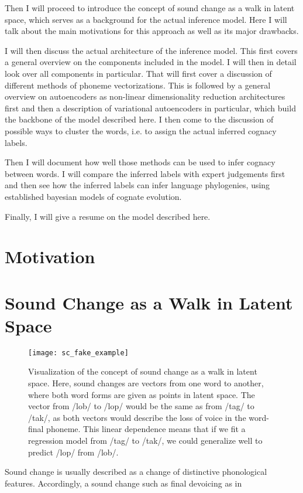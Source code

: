 \documentclass[8pt]{article}
\begin{document}
Then I will proceed to introduce the concept of sound change as a walk in latent space, which serves as a background for the actual inference model. Here I will talk about the main motivations for this approach as well as its major drawbacks. 


I will then discuss the actual architecture of the inference model. This first covers a general overview on the components included in the model. I will then in detail look over all components in particular. That will first cover a discussion of different methods of phoneme vectorizations. This is followed by a general overview on autoencoders as non-linear dimensionality reduction architectures first and then a description of variational autoencoders in particular, which build the backbone of the model described here. I then come to the discussion of possible ways to cluster the words, i.e. to assign the actual inferred cognacy labels.

Then I will document how well those methods can be used to infer cognacy between words. I will compare the inferred labels with expert judgements first and then see how the inferred labels can infer language phylogenies, using established bayesian models of cognate evolution.

Finally, I will give a resume on the model described here.

\section{Motivation}

\section{Sound Change as a Walk in Latent Space}
\label{Sound Change as a Walk in Latent Space}

\begin{figure}[h]
\begin{center}
\texttt{[image: sc\_fake\_example]} 
\caption{Visualization of the concept of sound change as a walk in latent space. Here, sound changes are vectors from one word to another, where both word forms are given as points in latent space. The vector from /lob/ to /lop/ would be the same as from /tag/ to /tak/, as both vectors would describe the loss of voice in the word-final phoneme. This linear dependence means that if we fit a regression model from /tag/ to /tak/, we could generalize well to predict /lop/ from /lob/.}
\label{default}
\end{center}
\end{figure}
Sound change is usually described as a change of distinctive phonological features.
Accordingly, a sound change such as final devoicing as in 
\end{document}
